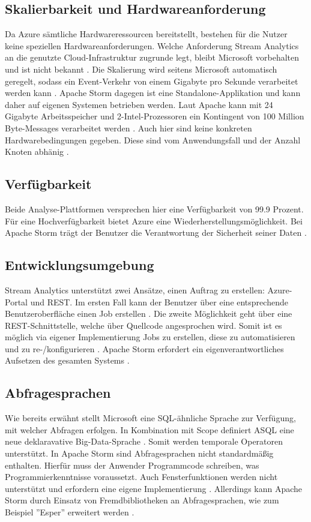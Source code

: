 \subsection{Skalierbarkeit und Hardwareanforderung}
Da Azure sämtliche Hardwareressourcen bereitstellt, bestehen für die Nutzer keine speziellen Hardwareanforderungen. Welche Anforderung Stream Analytics an die genutzte Cloud-Infrastruktur zugrunde legt, bleibt Microsoft vorbehalten und ist nicht bekannt \cite{samacha.2017}. Die Skalierung wird seitens Microsoft automatisch geregelt, sodass ein Event-Verkehr von einem Gigabyte pro Sekunde verarbeitet werden kann \cite{samacha.19.12.2017b}. Apache Storm dagegen ist eine Standalone-Applikation und kann daher auf eigenen Systemen betrieben werden. Laut Apache kann mit 24 Gigabyte Arbeitsspeicher und 2-Intel-Prozessoren ein Kontingent von 100 Million Byte-Messages verarbeitet werden \cite{apachescale.2017}. Auch hier sind keine konkreten Hardwarebedingungen gegeben. Diese sind vom Anwendungsfall und der Anzahl Knoten abhänig \cite{samacha.2017}.

\subsection{Verfügbarkeit}
Beide Analyse-Plattformen versprechen hier eine Verfügbarkeit von 99.9 Prozent. Für eine Hochverfügbarkeit bietet Azure eine Wiederherstellungsmöglichkeit. Bei Apache Storm  trägt der Benutzer die Verantwortung der Sicherheit seiner Daten \cite{samacha.2017} \cite{apachescale.2017}. 

\subsection{Entwicklungsumgebung}
Stream Analytics unterstützt zwei Ansätze, einen Auftrag zu erstellen: Azure-Portal und REST. Im ersten Fall kann der Benutzer über eine entsprechende Benutzeroberfläche einen Job erstellen \cite{jeffstokes72.19.12.2017}. Die zweite Möglichkeit geht über eine REST-Schnittstelle, welche über Quellcode angesprochen wird. Somit ist es möglich via eigener Implementierung Jobs zu erstellen, diese zu automatisieren und zu re-/konfigurieren \cite{samacha.19.12.2017}. Apache Storm erfordert ein eigenverantwortliches Aufsetzen des gesamten Systems \cite{apache.2017}. 

\subsection{Abfragesprachen} \label{absprache}
Wie bereits erwähnt stellt Microsoft eine SQL-ähnliche Sprache zur Verfügung, mit welcher Abfragen erfolgen. In Kombination mit Scope definiert ASQL eine neue deklaravative Big-Data-Sprache \cite{sql.2016}. Somit werden temporale Operatoren unterstützt. In Apache Storm sind Abfragesprachen nicht standardmäßig enthalten. Hierfür muss der Anwender Programmcode schreiben, was Programmierkenntnisse voraussetzt. Auch Fensterfunktionen werden nicht unterstützt und erfordern eine eigene Implementierung \cite{samacha.2017}. Allerdings kann Apache Storm durch Einsatz von Fremdbibliotheken an Abfragesprachen, wie zum Beispiel ''Esper'' erweitert werden \cite{esper.2016}.

